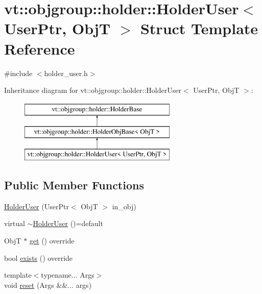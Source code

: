 \hypertarget{structvt_1_1objgroup_1_1holder_1_1_holder_user}{}\section{vt\+:\+:objgroup\+:\+:holder\+:\+:Holder\+User$<$ User\+Ptr, ObjT $>$ Struct Template Reference}
\label{structvt_1_1objgroup_1_1holder_1_1_holder_user}


{\ttfamily \#include $<$holder\+\_\+user.\+h$>$}

Inheritance diagram for vt\+:\+:objgroup\+:\+:holder\+:\+:Holder\+User$<$ User\+Ptr, ObjT $>$\+:\begin{figure}[H]
\begin{center}
\leavevmode
\includegraphics[height=3.000000cm]{structvt_1_1objgroup_1_1holder_1_1_holder_user}
\end{center}
\end{figure}
\subsection*{Public Member Functions}
\begin{DoxyCompactItemize}
\item 
\hyperlink{structvt_1_1objgroup_1_1holder_1_1_holder_user_a5c81ffca6d44450a02c9d74c650d2178}{Holder\+User} (User\+Ptr$<$ ObjT $>$ in\+\_\+obj)
\item 
virtual \hyperlink{structvt_1_1objgroup_1_1holder_1_1_holder_user_a694de38808a7075ef8fa919d9e983c8b}{$\sim$\+Holder\+User} ()=default
\item 
ObjT $\ast$ \hyperlink{structvt_1_1objgroup_1_1holder_1_1_holder_user_a102b494316b9f906a02f1c47b797e339}{get} () override
\item 
bool \hyperlink{structvt_1_1objgroup_1_1holder_1_1_holder_user_abba92cc4a99e045b64a1865fe1477fb2}{exists} () override
\item 
{\footnotesize template$<$typename... Args$>$ }\\void \hyperlink{structvt_1_1objgroup_1_1holder_1_1_holder_user_a4a43e5b38a0474cd523ccd9aa66950e9}{reset} (Args \&\&... args)
\end{DoxyCompactItemize}
